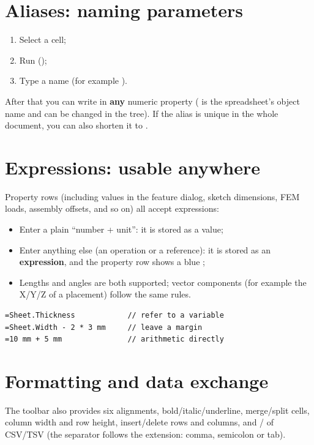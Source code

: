 \section{Aliases: naming parameters}

\begin{enumerate}
  \item Select a cell;
  \item Run  ();
  \item Type a name (for example ).
\end{enumerate}

After that you can write  in \textbf{any} numeric property ( is the
spreadsheet's object name and can be changed in the tree). If the alias is unique in the whole document,
you can also shorten it to .

\section{Expressions: usable anywhere}

Property rows (including values in the feature dialog, sketch dimensions, FEM loads, assembly offsets,
and so on) all accept expressions:

\begin{itemize}
  \item Enter a plain ``number + unit'': it is stored as a value;
  \item Enter anything else (an operation or a reference): it is stored as an \textbf{expression}, and the
        property row shows a blue ;
  \item Lengths and angles are both supported; vector components (for example the X/Y/Z of a placement)
        follow the same rules.
\end{itemize}

\begin{lstlisting}
=Sheet.Thickness            // refer to a variable
=Sheet.Width - 2 * 3 mm     // leave a margin
=10 mm + 5 mm               // arithmetic directly
\end{lstlisting}

\section{Formatting and data exchange}

The toolbar also provides six alignments, bold/italic/underline, merge/split cells, column width and row
height, insert/delete rows and columns, and / of CSV/TSV (the separator follows the
extension: comma, semicolon or tab).

